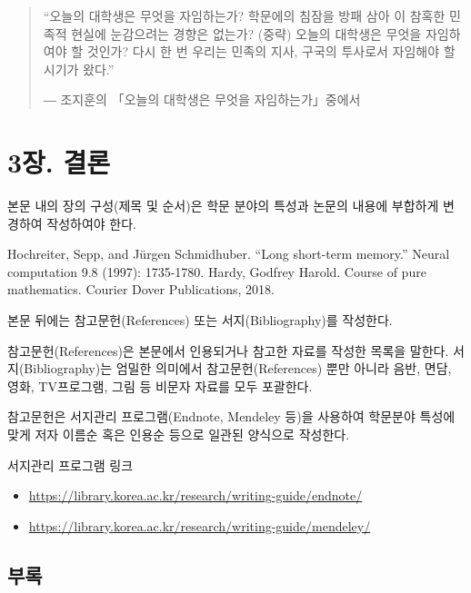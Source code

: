 \documentclass[11pt]{report}
\numberwithin{figure}{chapter}
\begin{document}
\begin{quotation}
“오늘의 대학생은 무엇을 자임하는가? 학문에의 침잠을 방패 삼아 이 참혹한 민족적 현실에 눈감으려는 경향은 없는가? (중략) 오늘의 대학생은 무엇을 자임하여야 할 것인가? 다시 한 번 우리는 민족의 지사, 구국의 투사로서 자임해야 할 시기가 왔다.” \par
― 조지훈의  「오늘의 대학생은 무엇을 자임하는가」중에서 
\end{quotation}



\chapter*{3장. 결론}
\setcounter{chapter}{3}
\setcounter{section}{0}
\setcounter{subsection}{0}
본문 내의 장의 구성(제목 및 순서)은 학문 분야의 특성과 논문의 내용에 부합하게 변경하여 작성하여야 한다.\par


\normalsize
\newpage
\renewcommand\bibname{참고문헌}
\begin{thebibliography}{AA}
 Hochreiter, Sepp, and Jürgen Schmidhuber. ``Long short-term memory.'' Neural computation 9.8 (1997): 1735-1780.
 Hardy, Godfrey Harold. Course of pure mathematics. Courier Dover Publications, 2018.
\end{thebibliography}

\bigskip

본문 뒤에는 참고문헌(References) 또는 서지(Bibliography)를 작성한다.\par
참고문헌(References)은 본문에서 인용되거나 참고한 자료를 작성한 목록을 말한다. 서지(Bibliography)는 엄밀한 의미에서 참고문헌(References) 뿐만 아니라 음반, 면담, 영화, TV프로그램, 그림 등 비문자 자료를 모두 포괄한다. \par
참고문헌은 서지관리 프로그램(Endnote, Mendeley 등)을 사용하여 학문분야 특성에 맞게 저자 이름순 혹은 인용순 등으로 일관된 양식으로 작성한다.


\bigskip

서지관리 프로그램 링크
\begin{itemize}
\item\url{https://library.korea.ac.kr/research/writing-guide/endnote/}
\item\url{https://library.korea.ac.kr/research/writing-guide/mendeley/}
\end{itemize}

\begin{center}
\chapter*{부록} %
\end{center}
\end{document}
